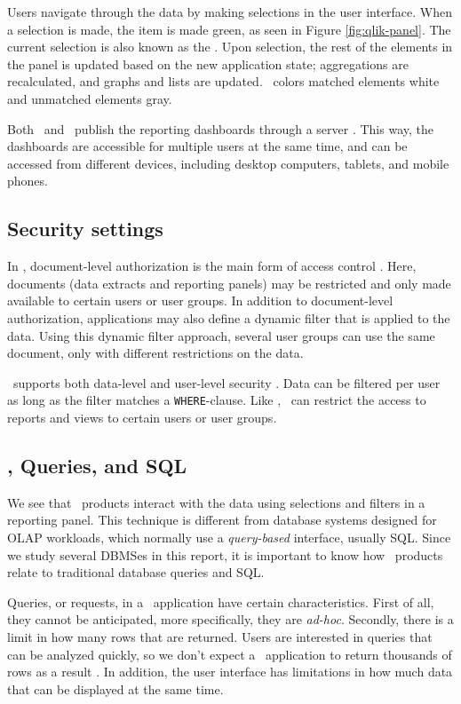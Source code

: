 Users navigate through the data by making selections in the user interface. When a selection is made, the item is made green, as seen in Figure \ref{fig:qlik-panel}. The current selection is also known as the . Upon selection, the rest of the elements in the panel is updated based on the new application state; aggregations are recalculated, and graphs and lists are updated. \qlikview~colors matched elements white and unmatched elements gray.

Both \qlikview~and \tableau~publish the reporting dashboards through a server \cite{Kamkolkar2015-iq, Qlik2011-ef}. This way, the dashboards are accessible for multiple users at the same time, and can be accessed from different devices, including desktop computers, tablets, and mobile phones.

\subsection{Security settings}
\label{sub:Security settings}
In \qlikview, document-level authorization is the main form of access control \cite{Qlik2011-hj}. Here, documents (data extracts and reporting panels) may be restricted and only made available to certain users or user groups. In addition to document-level authorization, applications may also define a dynamic filter that is applied to the data. Using this dynamic filter approach, several user groups can use the same document, only with different restrictions on the data.

\tableau~supports both data-level and user-level security \cite{Kamkolkar2015-iq}. Data can be filtered per user as long as the filter matches a \texttt{WHERE}-clause. Like \qlikview, \tableau~can restrict the access to reports and views to certain users or user groups.

\subsection{\bd, Queries, and SQL}
\label{sub:Business Discovery, Queries, and SQL}
We see that \bd~products interact with the data using selections and filters in a reporting panel. This technique is different from database systems designed for OLAP workloads, which normally use a \textit{query-based} interface, usually SQL. Since we study several DBMSes in this report, it is important to know how \bd~products relate to traditional database queries and SQL.

Queries, or requests, in a \bd~application have certain characteristics. First of all, they cannot be anticipated, more specifically, they are \textit{ad-hoc}. Secondly, there is a limit in how many rows that are returned. Users are interested in queries that can be analyzed quickly, so we don't expect a \bd~application to return thousands of rows as a result \cite{Ferrari2012-hm}. In addition, the user interface has limitations in how much data that can be displayed at the same time.


